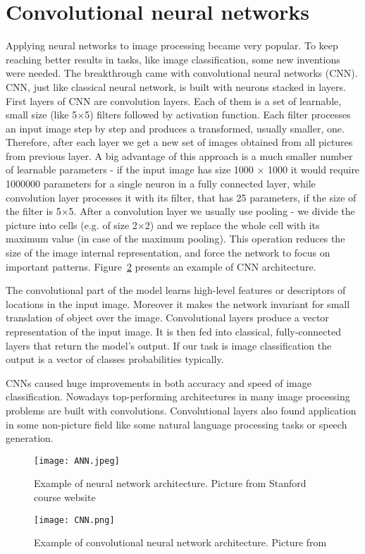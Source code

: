 \documentclass[shortabstract, inz, english]{iithesis}
\begin{document}
\section{Convolutional neural networks}
Applying neural networks to image processing became very popular. To keep reaching better results in tasks, like image classification, some new inventions were needed. The breakthrough came with convolutional neural networks (CNN). CNN, just like classical neural network, is built with neurons stacked in layers. First layers of CNN are convolution layers. Each of them is a set of learnable, small size (like 5$\times$5) filters followed by activation function. Each filter processes an input image step by step and produces a transformed, usually smaller, one. Therefore, after each layer we get a new set of images obtained from all pictures from previous layer. A big advantage of this approach is a much smaller number of learnable parameters - if the input image has size 1000 $\times$ 1000 it would require 1000000 parameters for a single neuron in a fully connected layer, while convolution layer processes it with its filter, that has 25 parameters, if the size of the filter is 5$\times$5.  After a convolution layer we usually use pooling - we divide the picture into cells (e.g. of size 2$\times$2) and we replace the whole cell with its maximum value (in case of the maximum pooling). This operation reduces the size of the image internal representation, and force the network to focus on important patterns. Figure~\ref{fig:CNN} presents an example of CNN architecture.
\par
The convolutional part of the model learns high-level features or descriptors of locations in the input image. Moreover it makes the network invariant for small translation of object over the image. Convolutional layers produce a vector representation of the input image. It is then fed into classical, fully-connected layers that return the model's output. If our task is image classification the output is a vector of classes probabilities typically.
\par
CNNs caused huge improvements in both accuracy and speed of image classification. Nowadays top-performing architectures in many image processing problems are built with convolutions. Convolutional layers also found application in some non-picture field like some natural language processing tasks or speech generation. 

\begin{figure}[htb]%
    \centering
    \texttt{[image: ANN.jpeg]}%
    \caption{Example of neural network architecture. Picture from Stanford course website \cite{stanford}}%
    \label{fig:ANN}%
\end{figure}
\begin{figure}[htb]%
    \centering
    \texttt{[image: CNN.png]}%
    \caption{Example of convolutional neural network architecture. Picture from \cite{cnn_im}}%
    \label{fig:CNN}%
\end{figure}
\end{document}
